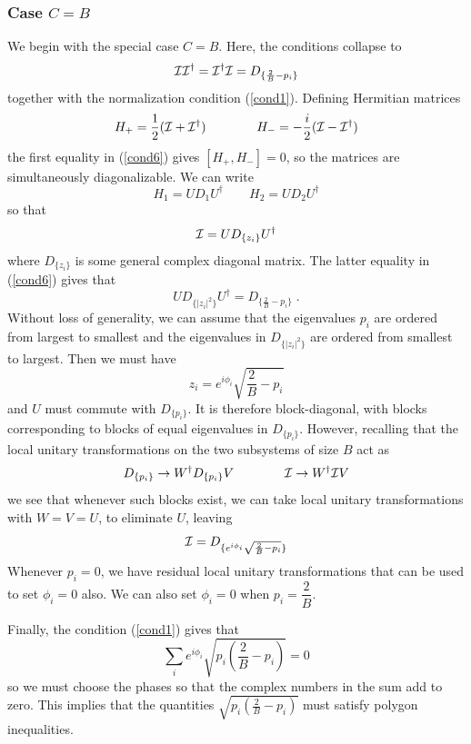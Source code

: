 \documentclass[12pt]{article}
\theoremstyle{definition}
\newcommand{\be}{\begin{equation}}
\newcommand{\ee}{\end{equation}}
\begin{document}
\subsubsection*{Case $C=B$}

We begin with the special case $C=B$. Here, the conditions collapse to
\be
\label{cond6}
{\cal I} {\cal I}^\dagger = {\cal I}^\dagger {\cal I} = D_{\{\frac{2}{B} - p_i\}}
\ee
together with the normalization condition (\ref{cond1}). Defining Hermitian matrices
\be
H_+ = \frac{1}{2} ({\cal I} + {\cal I}^\dagger) \qquad \qquad H_- = - \frac{i}{2} ({\cal I} - {\cal I}^\dagger)
\ee
the first equality in (\ref{cond6}) gives $[H_+,H_-] = 0$, so the matrices are simultaneously diagonalizable. We can write
\be
H_1 = U D_1 U^\dagger \qquad H_2 = U D_2 U^\dagger
\ee
so that
\be
{\cal I} = U D_{\{z_i\}} U^\dagger
\ee
where $D_{\{z_i\}}$ is some general complex diagonal matrix. The latter equality in (\ref{cond6}) gives that
\be
U D_{\{|z_i|^2\}} U^\dagger = D_{\{\frac{2}{B} - p_i\}} \; .
\ee
Without loss of generality, we can assume that the eigenvalues $p_i$ are ordered from largest to smallest and the eigenvalues in $D_{\{|z_i|^2\}}$ are ordered from smallest to largest. Then we must have
\be
z_i = e^{i \phi_i} \sqrt{\frac{2}{B} - p_i}
\ee
and $U$ must commute with $D_{\{p_i\}}$. It is therefore block-diagonal, with blocks corresponding to blocks of equal eigenvalues in $D_{\{p_i\}}$. However, recalling that the local unitary transformations on the two subsystems of size $B$ act as
\be
D_{\{p_i\}} \to W^\dagger D_{\{p_i\}} V \qquad \qquad {\cal I} \to W^\dagger {\cal I} V
\ee
we see that whenever such blocks exist, we can take local unitary transformations with $W = V = U$, to eliminate $U$, leaving
\be
{\cal I} = D_{\{e^{i \phi_i} \sqrt{\frac{2}{B} - p_i}  \}}
\ee
Whenever $p_i=0$, we have residual local unitary transformations that can be used to set $\phi_i=0$ also. We can also set $\phi_i = 0$ when $p_i = \dfrac{2}{B}$.

Finally, the condition (\ref{cond1}) gives that
\be
\label{polygon}
\sum_i e^{i \phi_i} \sqrt{p_i(\frac{2}{B} - p_i)}  = 0
\ee
so we must choose the phases so that the complex numbers in the sum add to zero. This implies that the quantities $\sqrt{p_i(\frac{2}{B} - p_i)}$ must satisfy polygon inequalities.
\end{document}
